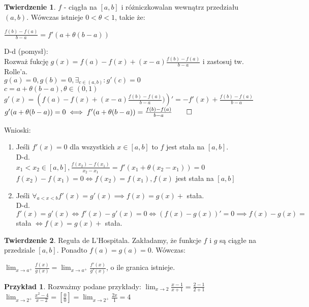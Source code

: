 \documentclass{article}
\theoremstyle{definition}
\theoremstyle{definition}
\newtheorem{tw}{Twierdzenie}[subsection]
\theoremstyle{definition}
\newtheorem{pk}{Przykład}[subsection]
\theoremstyle{definition}
\begin{document}
\begin{tw}
    $f$ - ciągła na $[a,b]$ i różniczkowalan wewnątrz przedziału $(a,b)$. Wówczas istnieje $0<\theta<1$, takie że:
    \begin{center}
        $\frac{f(b)-f(a)}{b-a} = f'(a+\theta(b-a))$
    \end{center}
    D-d (pomysł):\\
    Rozważ fukcję $g(x)=f(a)-f(x)+(x-a)\frac{f(b)-f(a)}{b-a}$ i zastosuj tw. Rolle'a.\\
    $g(a)=0, g(b)=0, \exists_{c\in(a,b)} : g'(c)=0$\\
    $c=a+\theta(b-a), \theta\in(0,1)$\\
    $g'(x)=\left(f(a)-f(x)+(x-a)\frac{f(b)-f(a)}{b-a})\right)'=-f'(x)+\frac{f(b)-f(a)}{b-a}$\\
    $g'(a+\theta(b-a))=0 \iff f'(a+\theta(b-a)) = \frac{f(b)-f(a)}{b-a}\qed$
\end{tw}
Wnioski:
\begin{enumerate}
    \item Jeśli $f'(x)=0$ dla wszystkich $x\in[a,b]$ to $f$ jest stała na $[a,b]$.\\
    D-d.\\
    $x_1<x_2\in[a,b], \frac{f(x_2)-f(x_1)}{x_2-x_1} = f'(x_1+\theta(x_2-x_1))=0$\\
    $f(x_2)-f(x_1) = 0 \iff f(x_2) = f(x_1), f(x)$ jest stała na $[a,b]$
    \item Jeśli $\forall_{a<x<b} f'(x)=g'(x) \implies f(x)=g(x) + $ stała.\\
    D-d.\\
    $f'(x)=g'(x)\iff f'(x)-g'(x)=0 \iff (f(x)-g(x))'=0 \implies f(x)-g(x) =$ stała $\iff f(x)=g(x) + $ stała.
\end{enumerate}

\begin{tw}
    Reguła de L'Hospitala. Zakładamy, że funkcje $f$ i $g$ są ciągłe na przedziale $[a,b]$. Ponadto $f(a)=g(a)=0$.
    Wówczas:
    \begin{center}
        $\lim_{x\rightarrow a^+} \frac{f(x)}{g(x)} = \lim_{x\rightarrow a^+} \frac{f'(x)}{g'(x)}$, o ile granica istnieje.
    \end{center}
\end{tw}

\begin{pk}
    Rozważmy podane przykłady:
    $\lim_{x\rightarrow 2} \frac{x-1}{x+1} = \frac{2-1}{2+1}$\\
    $\lim_{x\rightarrow 2^+} \frac{x^2-4}{x-2}=\left[\frac{0}{0}\right] = \lim_{x\rightarrow 2^+} \frac{2x}{1}=4$
\end{pk}
\end{document}
